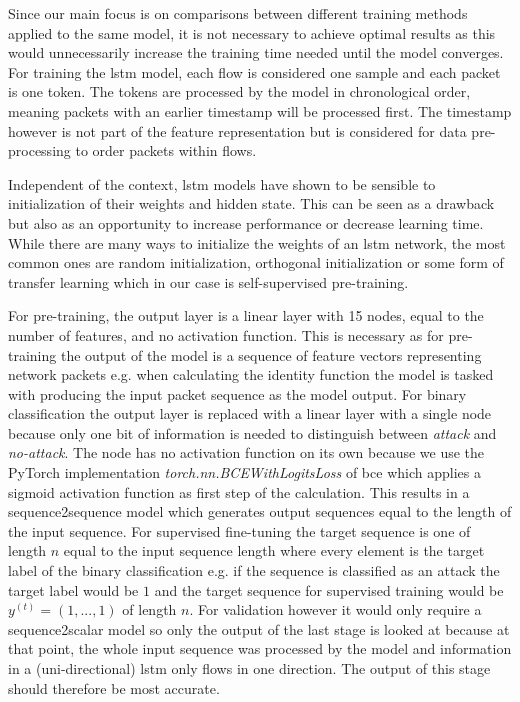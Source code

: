 Since our main focus is on comparisons between different training methods applied to the same model, it is not necessary to achieve optimal results as this would unnecessarily increase the training time needed until the model converges. For training the \gls{lstm} model, each flow is considered one sample and each packet is one token. The tokens are processed by the model in chronological order, meaning packets with an earlier timestamp will be processed first. The timestamp however is not part of the feature representation but is considered for data pre-processing to order packets within flows. \par
Independent of the context, \gls{lstm} models have shown to be sensible to initialization of their weights and hidden state. This can be seen as a drawback but also as an opportunity to increase performance or decrease learning time. While there are many ways to initialize the weights of an \gls{lstm} network, the most common ones are random initialization, orthogonal initialization or some form of transfer learning which in our case is self-supervised pre-training. \par
For pre-training, the output layer is a linear layer with 15 nodes, equal to the number of features, and no activation function. This is necessary as for pre-training the output of the model is a sequence of feature vectors representing network packets e.g. when calculating the identity function the model is tasked with producing the input packet sequence as the model output. For binary classification the output layer is replaced with a linear layer with a single node because only one bit of information is needed to distinguish between \textit{attack} and \textit{no-attack}. The node has no activation function on its own because we use the PyTorch implementation \textit{torch.nn.BCEWithLogitsLoss} of \gls{bce} which applies a sigmoid activation function as first step of the calculation. This results in a sequence2sequence model which generates output sequences equal to the length of the input sequence. For supervised fine-tuning the target sequence is one of length $n$ equal to the input sequence length where every element is the target label of the binary classification e.g. if the sequence is classified as an attack the target label would be $1$ and the target sequence for supervised training would be $y^{(t)} = (1,...,1)$ of length $n$. For validation however it would only require a sequence2scalar model so only the output of the last stage is looked at because at that point, the whole input sequence was processed by the model and information in a (uni-directional) \gls{lstm} only flows in one direction. The output of this stage should therefore be most accurate.

